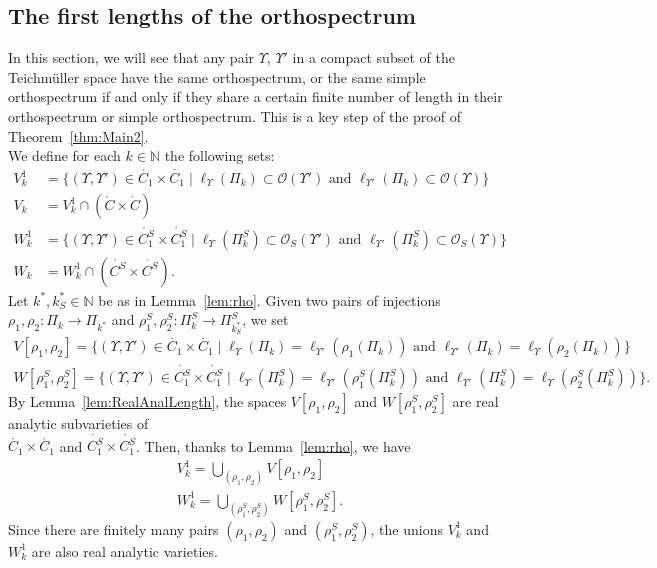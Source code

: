 \documentclass[a4paper,12pt]{article}
\theoremstyle{definition}
\theoremstyle{remark}
\begin{document}
\subsection{The first lengths of the orthospectrum}

In this section, we will see that any pair $\Upsilon$, $\Upsilon'$ in a compact subset of the Teichmüller space have the same orthospectrum, or the same simple orthospectrum if and only if they share a certain finite number of length in their orthospectrum or simple orthospectrum. This is a key step of the proof of Theorem~\ref{thm:Main2}.\\

We define for each $k \in \mathbb{N}$ the following sets:
\begin{align*}
    V_k^1 & =\{ (\Upsilon, \Upsilon') \in \mathring{C_1} \times \mathring{C_1} \mid  \ell_{\Upsilon} (\Pi_k) \subset \mathcal{O}(\Upsilon') \text{ and } \ell_{\Upsilon'} (\Pi_k) \subset \mathcal{O}(\Upsilon) \} \\
    V_k & = V_k^1 \cap (\mathring{C} \times \mathring{C}) \\
    W_k^1 & =\{ (\Upsilon, \Upsilon') \in \mathring{C_1^S} \times \mathring{C_1^S} \mid  \ell_{\Upsilon} (\Pi_k^S) \subset \mathcal{O}_S(\Upsilon') \text{ and } \ell_{\Upsilon'} (\Pi_k^S) \subset \mathcal{O}_S(\Upsilon) \} \\
    W_k & = W_k^1 \cap (\mathring{C^S} \times \mathring{C^S}).
\end{align*}
Let $k^*, k_S^*\in \mathbb{N} $ be as in Lemma~\ref{lem:rho}. Given two pairs of injections \mbox{$\rho_1, \rho_2 : \Pi_k \to \Pi_{k^*}$} and $\rho_1^S, \rho_2^S : \Pi_k^S \to \Pi_{k_S^*}^S$, we set
\begin{align*}
    V[\rho_1,\rho_2]=\{ (\Upsilon, \Upsilon') \in \mathring{C_1} \times \mathring{C_1} \mid  \ell_{\Upsilon} (\Pi_k) = \ell_{\Upsilon'} (\rho_1 (\Pi_k)) \text{ and } \ell_{\Upsilon'}( \Pi_k ) = \ell_{\Upsilon} (\rho_2 (\Pi_k)) \} \\
    W[\rho_1^S,\rho_2^S]=\{ (\Upsilon, \Upsilon') \in \mathring{C_1^S} \times \mathring{C_1^S} \mid  \ell_{\Upsilon} ( \Pi_k^S ) = \ell_{\Upsilon'} (\rho_1^S (\Pi_k^S)) \text{ and } \ell_{\Upsilon'} (\Pi_k^S ) = \ell_{\Upsilon} (\rho_2^S (\Pi_k^S)) \}.
\end{align*}
By Lemma~\ref{lem:RealAnalLength}, the spaces $V[\rho_1,\rho_2]$ and $W[\rho_1^S,\rho_2^S]$ are real analytic subvarieties of \\
$\mathring{C_1} \times \mathring{C_1}$ and $\mathring{C_1^S} \times \mathring{C_1^S}$. Then, thanks to Lemma~\ref{lem:rho}, we have
\begin{align*}
    V_k^1= \bigcup_{(\rho_1, \rho_2)} V[\rho_1,\rho_2] \\
    W_k^1= \bigcup_{(\rho_1^S, \rho_2^S)} W[\rho_1^S,\rho_2^S].
\end{align*}
Since there are finitely many pairs $(\rho_1, \rho_2)$ and $(\rho_1^S,\rho_2^S)$, the unions $V_k^1$ and $W_k^1$ are also real analytic varieties.\\
\end{document}
